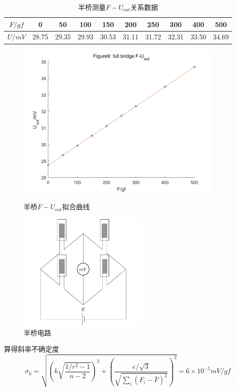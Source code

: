 \documentclass[12pt, a4paper]{ctexart}
\begin{document}
\begin{table}[htbp]
    \centering
    \begin{tabular}{cccccccccc}
        \toprule
        $F/gf$ & 0 & 50 & 100 & 150 & 200 & 250 & 300 & 400 & 500 \\
        \midrule
        $U/mV$ & 28.75 & 29.35 & 29.93 & 30.53 & 31.11 & 31.72 & 32.31 & 33.50 & 34.69 \\
        \bottomrule
    \end{tabular}
    \caption{半桥测量$F-U_{out}$关系数据}
    \label{t8}
\end{table}

\begin{figure}[htbp]
    \centering
    \caption{半桥$F-U_{out}$拟合曲线}
    \includegraphics[width=4in]{figure/full bridge F-U_out.png}
    \label{fig9}
\end{figure}

\begin{figure}
    \includegraphics[width=2.5in]{figure/full bridge.png}
    \caption{半桥电路}
    \label{fig8}
\end{figure}

算得斜率不确定度
\begin{equation*}
    \sigma_k = \sqrt{(k\sqrt{\frac{1/r^2-1}{n-2}})^2 + (\frac{e/\sqrt{3}}{\sqrt{\sum_i (F_i - \bar{F})^2}})^2} = 6 \times 10^{-5}mV/gf
\end{equation*}
\end{document}
